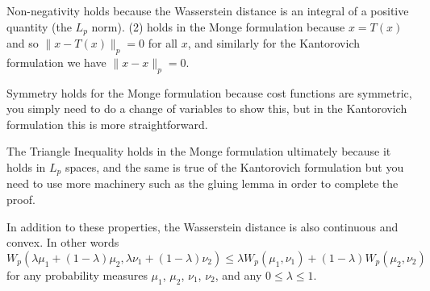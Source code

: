 Non-negativity holds because the Wasserstein distance is an integral of a positive quantity (the $L_p$ norm). (2) holds in the Monge formulation because $x = T(x)$ and so $\|x - T(x)\|_p = 0$ for all $x$, and similarly for the Kantorovich formulation we have $\|x - x\|_p = 0$.

Symmetry holds for the Monge formulation because cost functions are symmetric, you simply need to do a change of variables to show this, but in the Kantorovich formulation this is more straightforward.

The Triangle Inequality holds in the Monge formulation ultimately because it holds in $L_p$ spaces, and the same is true of the Kantorovich formulation but you need to use more machinery such as the gluing lemma in order to complete the proof.

In addition to these properties, the Wasserstein distance is also continuous and convex. In other words $$W_p(\lambda\mu_1+(1-\lambda)\mu_2,\lambda\nu_1+(1-\lambda)\nu_2)\leq \lambda W_p(\mu_1,\nu_1)+(1-\lambda)W_p(\mu_2,\nu_2)$$ for any probability measures $\mu_1$, $\mu_2$, $\nu_1$, $\nu_2$, and any $0\leq \lambda \leq 1$.






